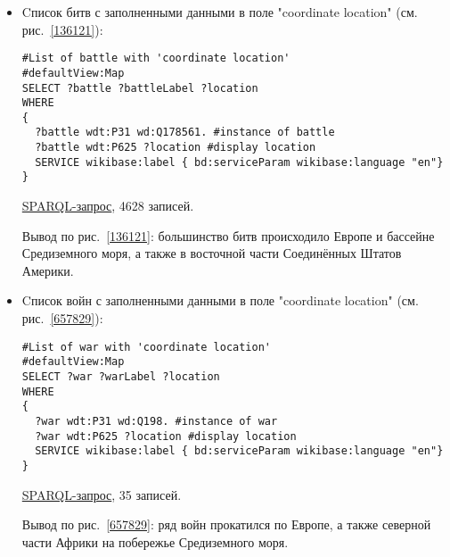 \begin{itemize}
\item{Cписок битв с заполненными данными в поле "coordinate location" (см. рис.~\ref{136121}):}
\begin{lstlisting}[language=SPARQL ]
#List of battle with 'coordinate location' 
#defaultView:Map
SELECT ?battle ?battleLabel ?location
WHERE
{
  ?battle wdt:P31 wd:Q178561. #instance of battle
  ?battle wdt:P625 ?location #display location
  SERVICE wikibase:label { bd:serviceParam wikibase:language "en"}
}
\end{lstlisting}

\href{https://query.wikidata.org/#%23List%20of%20battle%20with%20%27coordinate%20location%27%20%0A%23defaultView%3AMap%0ASELECT%20%3Fbattle%20%3FbattleLabel%20%3Flocation%0AWHERE%0A%7B%0A%20%20%3Fbattle%20wdt%3AP31%20wd%3AQ178561.%20%23instance%20of%20battle%0A%20%20%3Fbattle%20wdt%3AP625%20%3Flocation%20%23display%20location%0A%20%20SERVICE%20wikibase%3Alabel%20%7B%20bd%3AserviceParam%20wikibase%3Alanguage%20%22en%22%7D%0A%7D}{SPARQL-запрос}, 4628 записей.

Вывод по рис.~\ref{136121}: большинство битв происходило Европе и бассейне Средиземного моря, а также в восточной части Соединённых Штатов Америки.

\item{Cписок войн с заполненными данными в поле "coordinate location" (см. рис.~\ref{657829}):} 


\begin{lstlisting}[language=SPARQL]
#List of war with 'coordinate location' 
#defaultView:Map
SELECT ?war ?warLabel ?location
WHERE
{
  ?war wdt:P31 wd:Q198. #instance of war
  ?war wdt:P625 ?location #display location
  SERVICE wikibase:label { bd:serviceParam wikibase:language "en"}
}
\end{lstlisting}


\href{https://query.wikidata.org/#%23List%20of%20war%20with%20%27coordinate%20location%27%20%0A%23defaultView%3AMap%0ASELECT%20%3Fwar%20%3FwarLabel%20%3Flocation%0AWHERE%0A%7B%0A%20%20%3Fwar%20wdt%3AP31%20wd%3AQ198.%20%23instance%20of%20war%0A%20%20%3Fwar%20wdt%3AP625%20%3Flocation%20%23display%20location%0A%20%20SERVICE%20wikibase%3Alabel%20%7B%20bd%3AserviceParam%20wikibase%3Alanguage%20%22en%22%7D%0A%7D}{SPARQL-запрос}, 35 записей.

Вывод по рис.~\ref{657829}: ряд войн прокатился по Европе, а также северной части Африки на побережье Средиземного моря.


\end{itemize}
